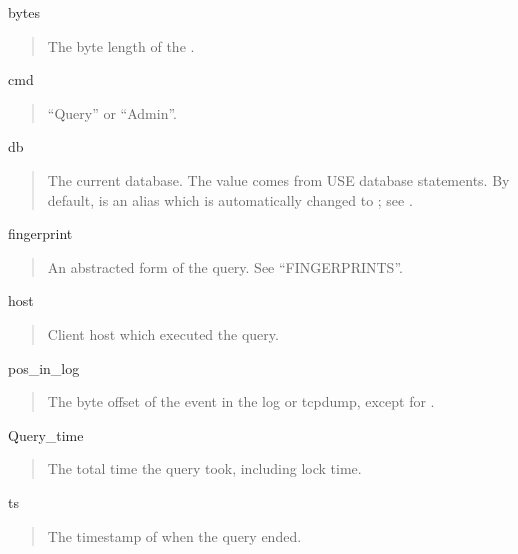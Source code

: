 \documentclass[letterpaper,10pt,english]{sphinxmanual}
\begin{document}
\sphinxAtStartPar
bytes
\begin{quote}

\sphinxAtStartPar
The byte length of the .
\end{quote}

\sphinxAtStartPar
cmd
\begin{quote}

\sphinxAtStartPar
“Query” or “Admin”.
\end{quote}

\sphinxAtStartPar
db
\begin{quote}

\sphinxAtStartPar
The current database.  The value comes from USE database statements.
By default,  is an alias which is automatically
changed to ; see {\hyperref[\detokenize{mariadb-query-digest:cmdoption-mariadb-query-digest-attribute-aliases}]{}}.
\end{quote}

\sphinxAtStartPar
fingerprint
\begin{quote}

\sphinxAtStartPar
An abstracted form of the query.  See “FINGERPRINTS”.
\end{quote}

\sphinxAtStartPar
host
\begin{quote}

\sphinxAtStartPar
Client host which executed the query.
\end{quote}

\sphinxAtStartPar
pos\_in\_log
\begin{quote}

\sphinxAtStartPar
The byte offset of the event in the log or tcpdump,
except for {\hyperref[\detokenize{mariadb-query-digest:cmdoption-mariadb-query-digest-processlist}]{}}.
\end{quote}

\sphinxAtStartPar
Query\_time
\begin{quote}

\sphinxAtStartPar
The total time the query took, including lock time.
\end{quote}

\sphinxAtStartPar
ts
\begin{quote}

\sphinxAtStartPar
The timestamp of when the query ended.
\end{quote}
\end{document}
